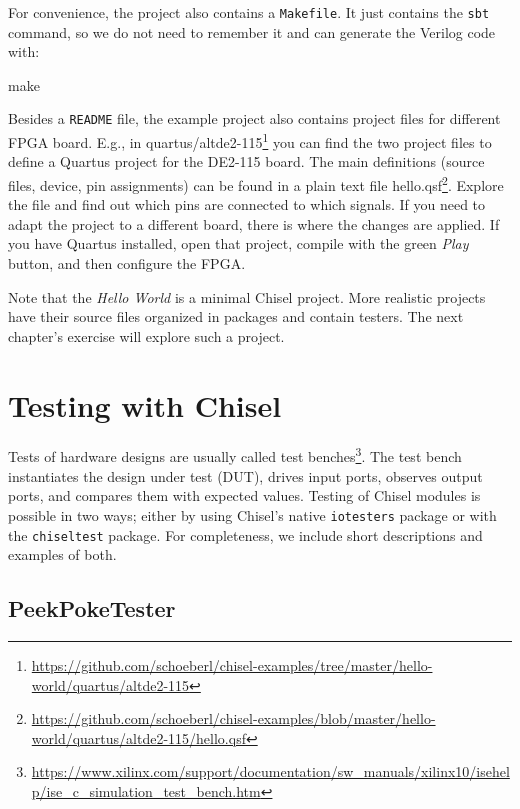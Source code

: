 \documentclass[%
    10pt,
    headinclude, footexclude,
    openright, %
    notitlepage,
    cleardoubleempty,
    headsepline,
    pointlessnumbers,
    bibtotoc, idxtotoc,
    ]{scrbook}
\newcommand{\code}[1]{{\small{\texttt{#1}}}}
\newcommand{\myref}[2]{\href{#1}{#2}}
\renewcommand{\myref}[2]{{#2}{\footnote{\url{#1}}}}
\begin{document}
For convenience, the project also contains a \code{Makefile}.
It just contains the \code{sbt} command, so we do not need to remember it and
can generate the Verilog code with:

\begin{chisel}
make
\end{chisel}

Besides a \code{README} file, the example project also contains project
files for different FPGA board. E.g., in
\myref{https://github.com/schoeberl/chisel-examples/tree/master/hello-world/quartus/altde2-115}{quartus/altde2-115} 
you can find the two project files to define a Quartus project for the DE2-115 board.
The main definitions (source files, device, pin assignments) can be found in a plain text file
\myref{https://github.com/schoeberl/chisel-examples/blob/master/hello-world/quartus/altde2-115/hello.qsf}{hello.qsf}.
Explore the file and find out which pins are connected to which signals.
If you need to adapt the project to a different board, there is where the changes are applied.
If you have Quartus installed, open that project, compile with the green \emph{Play} button,
and then configure the FPGA.

Note that the \emph{Hello World} is a minimal Chisel project.
More realistic projects have their source files organized in packages and contain testers.
The next chapter's exercise will explore such a project.

\chapter{Testing with Chisel}


Tests of hardware designs are usually called \myref{https://www.xilinx.com/support/documentation/sw_manuals/xilinx10/isehelp/ise_c_simulation_test_bench.htm}{test benches}.
The test bench instantiates the design under test (DUT), drives input ports, observes output ports,
and compares them with expected values. Testing of Chisel modules is possible in two ways; either by using 
Chisel's native \code{iotesters} package or with the \code{chiseltest} package. For completeness, we 
include short descriptions and examples of both.

\section{PeekPokeTester}
\end{document}
